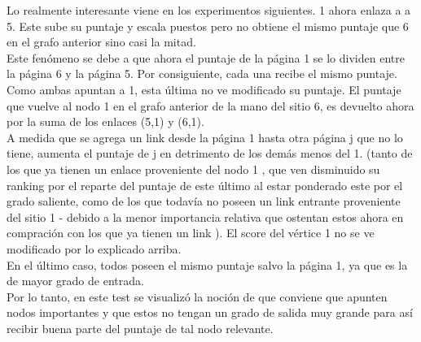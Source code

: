 Lo realmente interesante viene en los experimentos siguientes. 1 ahora enlaza a a 5. Este sube su puntaje y escala puestos pero no obtiene el mismo puntaje que 6 en el grafo anterior sino casi la mitad.\\
Este fenómeno se debe a que ahora el puntaje de la página 1 se lo dividen entre la página 6 y la página 5. Por consiguiente, cada una recibe el mismo puntaje. Como ambas apuntan a 1, esta última no ve modificado su puntaje. El puntaje que vuelve al nodo 1 en el grafo anterior de la mano del sitio 6, es devuelto ahora por la suma de los enlaces (5,1) y (6,1). \\

A medida que se agrega un link desde la página 1 hasta otra página j que no lo tiene, aumenta el puntaje de j en detrimento de los demás menos del 1. (tanto de los que ya tienen un enlace proveniente del nodo 1 , que ven disminuido su ranking por el reparte del puntaje de este último al estar ponderado este por el grado saliente, como de los que todavía no poseen un link entrante proveniente del sitio 1 - debido a la menor importancia relativa que ostentan estos ahora en compración con los que ya tienen un link ). El score del vértice 1 no se ve modificado por lo explicado arriba.  \\

En el último caso, todos poseen el mismo puntaje salvo la página 1, ya que es la de mayor grado de entrada. \\
Por lo tanto, en este test se visualizó la noción de que conviene que apunten nodos importantes y que estos no tengan un grado de salida muy grande para así recibir buena parte del puntaje de tal nodo relevante. \\           
                                               